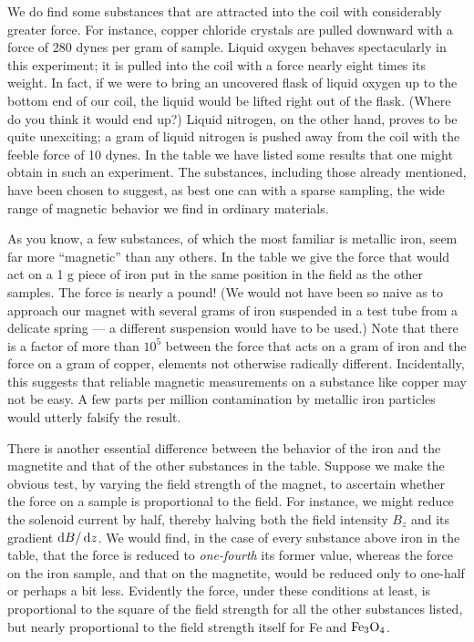 We do find some substances that are attracted into the coil with
considerably greater force. For instance, copper chloride crystals
are pulled downward with a force of 280 dynes per gram of sample.
Liquid oxygen behaves spectacularly in this experiment; it is pulled
into the coil with a force nearly eight times its weight. In fact, if we
were to bring an uncovered flask of liquid oxygen up to the bottom
end of our coil, the liquid would be lifted right out of the flask.
(Where do you think it would end up?) Liquid nitrogen, on the
other hand, proves to be quite unexciting; a gram of liquid nitrogen
is pushed away from the coil with the feeble force of 10 dynes. In the
table we have listed some results that one might obtain in such an
experiment. The substances, including those already mentioned,
have been chosen to suggest, as best one can with a sparse sampling,
the wide range of magnetic behavior we find in ordinary materials.

As you know, a few substances, of which the most familiar is
metallic iron, seem far more ``magnetic'' than any others. In the
table we give the force that would act on a 1 g piece of iron put in
the same position in the field as the other samples. The force is
nearly a pound! (We would not have been so naive as to approach
our magnet with several grams of iron suspended in a test tube from
a delicate spring --- a different suspension would have to be used.)
Note that there is a factor of more than $10^5$ between the force that
acts on a gram of iron and the force on a gram of copper, elements
not otherwise radically different. Incidentally, this suggests that
reliable magnetic measurements on a substance like copper may
not be easy. A few parts per million contamination by metallic iron
particles would utterly falsify the result.

There is another essential difference between the behavior of the
iron and the magnetite and that of the other substances in the table.
Suppose we make the obvious test, by varying the field strength of
the magnet, to ascertain whether the force on a sample is proportional
to the field. For instance, we might reduce the solenoid current
by half, thereby halving both the field intensity $B_z$ and its gradient
$\operatorname{d\!} B/\operatorname{d\!} z$. We would find, in the case of every substance above
iron in the table, that the force is reduced to \emph{one-fourth} its former
value, whereas the force on the iron sample, and that on the 
magnetite, would be reduced only to one-half or perhaps a bit less.
Evidently the force, under these conditions at least, is proportional
to the square of the field strength for all the other substances listed,
but nearly proportional to the field strength itself for Fe and $\textup{Fe}_3\textup{O}_4$.

